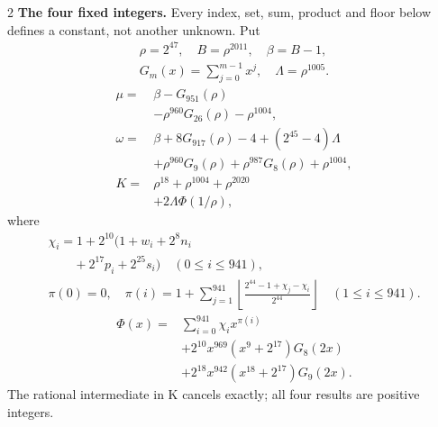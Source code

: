 \documentclass[10pt]{article}
\newcommand{\fl}[1]{\left\lfloor#1\right\rfloor}
\begin{document}
\begin{multicols}{2}
\textbf{The four fixed integers.}
Every index, set, sum, product and floor below defines a constant, not
another unknown. Put
\[
\begin{gathered}
\rho=2^{47},\quad B=\rho^{2011},\quad\beta=B-1,\\
G_m(x)=\sum_{j=0}^{m-1}x^j,\quad
\Lambda=\rho^{1005}.
\end{gathered}
\]
\begin{align*}
\mu={}&\beta-G_{951}(\rho)\\
&-\rho^{960}G_{26}(\rho)-\rho^{1004},\\
\omega={}&\beta+8G_{917}(\rho)-4+(2^{45}-4)\Lambda\\
&+\rho^{960}G_9(\rho)+\rho^{987}G_8(\rho)
  +\rho^{1004},\\
K={}&\rho^{18}+\rho^{1004}+\rho^{2020}\\
&+2\Lambda\Phi(1/\rho),
\end{align*}
where
\[
\begin{gathered}
\chi_i=1+2^{10}(1+w_i+2^8n_i\\
\qquad+2^{17}p_i+2^{25}s_i)\quad(0\le i\le941),\\
\pi(0)=0,\quad\pi(i)=1+\sum_{j=1}^{941}
\fl{\frac{2^{44}-1+\chi_j-\chi_i}{2^{44}}}\quad(1\le i\le941).
\end{gathered}
\]
\[
\begin{split}
\Phi(x)={}&\sum_{i=0}^{941}\chi_i x^{\pi(i)}\\
&+2^{10}x^{969}(x^9+2^{17})G_8(2x)\\
&+2^{18}x^{942}(x^{18}+2^{17})G_9(2x).
\end{split}
\]
The rational intermediate in K cancels exactly; all four results are positive integers.


\end{multicols}
\end{document}
